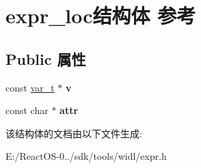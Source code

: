 \hypertarget{structexpr__loc}{}\section{expr\+\_\+loc结构体 参考}
\label{structexpr__loc}
\subsection*{Public 属性}
\begin{DoxyCompactItemize}
\item 
\mbox{\label{structexpr__loc_ab88abc089dc7342287d9184121d4b67f}} 
const \hyperlink{struct__var__t}{var\+\_\+t} $\ast$ {\bfseries v}
\item 
\mbox{\label{structexpr__loc_ad68aa4290c1865fc61686295caf16dd8}} 
const char $\ast$ {\bfseries attr}
\end{DoxyCompactItemize}


该结构体的文档由以下文件生成\+:\begin{DoxyCompactItemize}
\item 
E\+:/\+React\+O\+S-\/0../sdk/tools/widl/expr.\+h\end{DoxyCompactItemize}
